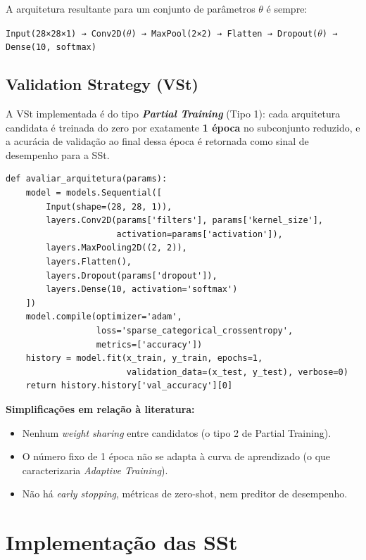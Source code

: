 \documentclass[a4paper,12pt]{article}
\begin{document}
A arquitetura resultante para um conjunto de parâmetros $\theta$ é sempre:

\begin{center}
\texttt{Input(28×28×1) → Conv2D(\(\theta\)) → MaxPool(2×2) → Flatten → Dropout(\(\theta\)) → Dense(10, softmax)}
\end{center}

\subsection{Validation Strategy (VSt)}

A VSt implementada é do tipo \textbf{\textit{Partial Training}} (Tipo 1): cada arquitetura candidata é treinada do zero por exatamente \textbf{1 época} no subconjunto reduzido, e a acurácia de validação ao final dessa época é retornada como sinal de desempenho para a SSt.

\begin{lstlisting}[style=python, caption={Implementação da VSt (Partial Training, 1 época).}]
def avaliar_arquitetura(params):
    model = models.Sequential([
        Input(shape=(28, 28, 1)),
        layers.Conv2D(params['filters'], params['kernel_size'],
                      activation=params['activation']),
        layers.MaxPooling2D((2, 2)),
        layers.Flatten(),
        layers.Dropout(params['dropout']),
        layers.Dense(10, activation='softmax')
    ])
    model.compile(optimizer='adam',
                  loss='sparse_categorical_crossentropy',
                  metrics=['accuracy'])
    history = model.fit(x_train, y_train, epochs=1,
                        validation_data=(x_test, y_test), verbose=0)
    return history.history['val_accuracy'][0]
\end{lstlisting}

\textbf{Simplificações em relação à literatura:}
\begin{itemize}[noitemsep]
    \item Nenhum \textit{weight sharing} entre candidatos (o tipo 2 de Partial Training).
    \item O número fixo de 1 época não se adapta à curva de aprendizado (o que caracterizaria \textit{Adaptive Training}).
    \item Não há \textit{early stopping}, métricas de zero-shot, nem preditor de desempenho.
\end{itemize}

\section{Implementação das SSt}
\end{document}

